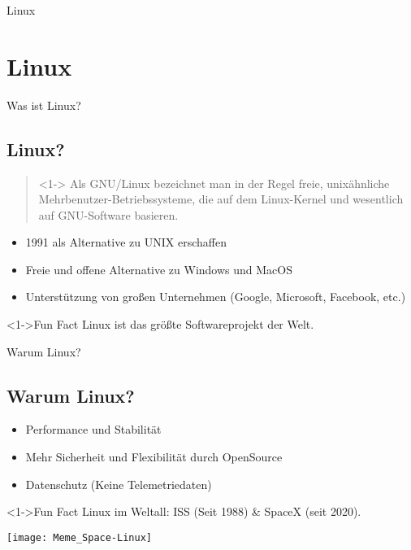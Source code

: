
\begin{frame}{Linux}
    \section{Linux}\label{sec:Linux}
\end{frame}

\begin{frame}{Was ist Linux?}
    \subsection{Linux?}\label{subsec:linux?}

    \begin{quote}<1->
        Als GNU/Linux bezeichnet man in der Regel freie, unixähnliche Mehrbenutzer-Betriebssysteme, die auf dem Linux-Kernel und wesentlich auf GNU-Software basieren.
    \end{quote}

    \begin{itemize}
        \item<2-> 1991 als Alternative zu UNIX erschaffen
        \item<3-> Freie und offene Alternative zu Windows und MacOS
        \item<4-> Unterstützung von großen Unternehmen (Google, Microsoft, Facebook, etc.)
    \end{itemize}
    \begin{exampleblock}<1->{Fun Fact}
        Linux ist das größte Softwareprojekt der Welt.
    \end{exampleblock}

\end{frame}

\begin{frame}{Warum Linux?}
    \subsection{Warum Linux?}\label{subsec:warum-linux?}

    \begin{itemize}
        \item Performance und Stabilität
        \item Mehr Sicherheit und Flexibilität durch OpenSource
        \item Datenschutz (Keine Telemetriedaten)
    \end{itemize}

    \begin{exampleblock}<1->{Fun Fact}
        Linux im Weltall: ISS (Seit 1988) \& SpaceX (seit 2020).
    \end{exampleblock}
    \texttt{[image: Meme\_Space-Linux]}

\end{frame}

